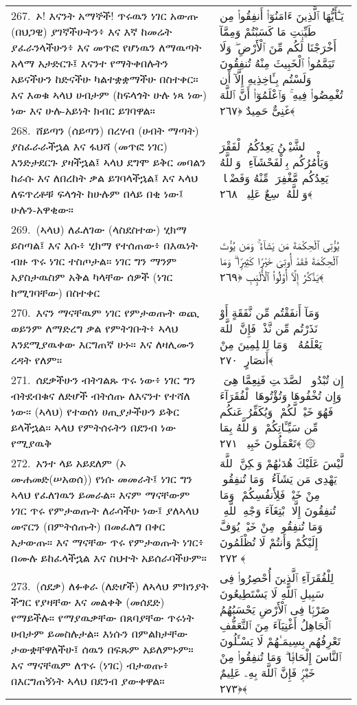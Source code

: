\documentclass[11pt,a4paper,oneside]{article}%
\newcommand{\mytextarabic}[1]{\textarabic{ #1 \flushright}}
\begin{document}
\begin{longtable}{%
  @{}
    p{}
  @{~~~}
    p{}
    @{}
}
267.\ ኦ! እናንት አማኞች! ጥሩዉን ነገር አውጡ (በህጋዊ) ያገኛችሁትን፥ እና እኛ ከመሬት ያፈራንላችሁን፥ እና መጥፎ የሆነዉን ለማዉጣት አላማ አታድርጉ፤ እናንተ የማትቀበሉትን አይናችሁን ከድናችሁ ካልተቋቋማችሁ በስተቀር። እና እወቁ ኣላህ ሀብታም (ከፍላጎት ሁሉ ነጻ ነው) ነው እና ሁሉ-አይነት ክብር ይገባዋል። &  \mytextarabic{ يَـٰٓأَيُّهَا ٱلَّذِينَ ءَامَنُوٓا۟ أَنفِقُوا۟ مِن طَيِّبَٟتِ مَا كَسَبْتُمْ وَمِمَّآ أَخْرَجْنَا لَكُم مِّنَ ٱلْأَرْضِ ۖ وَلَا تَيَمَّمُوا۟ ٱلْخَبِيثَ مِنْهُ تُنفِقُونَ وَلَسْتُم بِـَٔاخِذِيهِ إِلَّآ أَن تُغْمِضُوا۟ فِيهِ ۚ وَٱعْلَمُوٓا۟ أَنَّ ٱللَّهَ غَنِىٌّ حَمِيدٌ ﴿٢٦٧﴾}\\
268.\ ሸይጣን (ሰይጣን) በረሃብ (ሀብት ማጣት) ያስፈራራችኋል እና ፋህሻ (መጥፎ ነገር) እንድታደርጉ ያዛችኋል፤ ኣላህ ደግሞ ይቅር መባልን ከራሱ እና ለበረከት ቃል ይገባላችኋል፤ እና ኣላህ ለፍጥረቶቹ ፍላጎት ከሁሉም በላይ በቂ ነው፤ ሁሉን-አዋቂው። &  \mytextarabic{ٱلشَّيْطَٟنُ يَعِدُكُمُ ٱلْفَقْرَ وَيَأْمُرُكُم بِٱلْفَحْشَآءِ ۖ وَٱللَّهُ يَعِدُكُم مَّغْفِرَةًۭ مِّنْهُ وَفَضْلًۭا ۗ وَٱللَّهُ وَٟسِعٌ عَلِيمٌۭ ﴿٢٦٨﴾}\\
269.\ (ኣላህ) ለፈለገው (ላስደስተው) ሂክማ ይስጣል፤ እና እሱ፥ ሂክማ የተሰጠው፥ በእዉነት ብዙ ጥሩ ነገር ተስጦታል። ነገር ግን ማንም አያስታዉስም አቅል ካላቸው ሰዎች (ነገር ከሚገባቸው) በስተቀር &  \mytextarabic{يُؤْتِى ٱلْحِكْمَةَ مَن يَشَآءُ ۚ وَمَن يُؤْتَ ٱلْحِكْمَةَ فَقَدْ أُوتِىَ خَيْرًۭا كَثِيرًۭا ۗ وَمَا يَذَّكَّرُ إِلَّآ أُو۟لُوا۟ ٱلْأَلْبَٟبِ ﴿٢٦٩﴾}\\
270.\ እናን ማናቸዉም ነገር የምታወጡት ወጪ ወይንም ለማድረግ ቃል የምትገቡት፥ ኣላህ እንደሚያዉቀው እርግጠኛ ሁኑ። እና ለዛሊሙን ረዳት የለም። &  \mytextarabic{وَمَآ أَنفَقْتُم مِّن نَّفَقَةٍ أَوْ نَذَرْتُم مِّن نَّذْرٍۢ فَإِنَّ ٱللَّهَ يَعْلَمُهُۥ ۗ وَمَا لِلظَّٟلِمِينَ مِنْ أَنصَارٍ ﴿٢٧٠﴾}\\
271.\ ሰደቃችሁን ብትገልጹ ጥሩ ነው፥ ነገር ግን ብትደብቁና ለድሆች ብትሰጡ ለእናንተ የተሻለ ነው። (ኣላህ) የተወሰነ ሀጢያታችሁን ይቅር ይላችኋል። ኣላህ የምትሰሩትን በደንብ ነው የሚያዉቅ &  \mytextarabic{إِن تُبْدُوا۟ ٱلصَّدَقَٟتِ فَنِعِمَّا هِىَ ۖ وَإِن تُخْفُوهَا وَتُؤْتُوهَا ٱلْفُقَرَآءَ فَهُوَ خَيْرٌۭ لَّكُمْ ۚ وَيُكَفِّرُ عَنكُم مِّن سَيِّـَٔاتِكُمْ ۗ وَٱللَّهُ بِمَا تَعْمَلُونَ خَبِيرٌۭ ﴿٢٧١﴾ ۞}\\
272.\ አንተ ላይ አይደለም (ኦ ሙሐመድ(ሠአወሰ)) የነሱ መመራት፤ ነገር ግን ኣላህ የፈለገዉን ይመራል። እናም ማናቸውም ነገር ጥሩ የምታወጡት ለራሳችሁ ነው፤ ያለኣላህ መኖርን (በምትሰጡት) በመፈለግ በቀር አታውጡ። እና ማናቸው ጥሩ የምታወጡት ነገር፥ በሙሉ ይከፈላችኋል እና ስህተት አይሰራባችሁም። &  \mytextarabic{ لَّيْسَ عَلَيْكَ هُدَىٰهُمْ وَلَٟكِنَّ ٱللَّهَ يَهْدِى مَن يَشَآءُ ۗ وَمَا تُنفِقُوا۟ مِنْ خَيْرٍۢ فَلِأَنفُسِكُمْ ۚ وَمَا تُنفِقُونَ إِلَّا ٱبْتِغَآءَ وَجْهِ ٱللَّهِ ۚ وَمَا تُنفِقُوا۟ مِنْ خَيْرٍۢ يُوَفَّ إِلَيْكُمْ وَأَنتُمْ لَا تُظْلَمُونَ ﴿٢٧٢﴾}\\
273.\ (ሰደቃ) ለፉቀራ (ለድሆች) ለኣላህ ምክንያት ችግር የያዛቸው እና መልቀቅ (መሰደድ) የማይችሉ። የማያዉቃቸው በጸባያቸው ጥሩነት ሀብታም ይመስሉታል። እነሱን በምልክታቸው ታውቋቸዋለችሁ፤ ሰዉን በፍጹም አይለምኑም። እና ማናቸዉም ለጥሩ (ነገር) ብታወጡ፥ በእርግጠኝነት ኣላህ በደንብ ያውቀዋል።  &  \mytextarabic{ لِلْفُقَرَآءِ ٱلَّذِينَ أُحْصِرُوا۟ فِى سَبِيلِ ٱللَّهِ لَا يَسْتَطِيعُونَ ضَرْبًۭا فِى ٱلْأَرْضِ يَحْسَبُهُمُ ٱلْجَاهِلُ أَغْنِيَآءَ مِنَ ٱلتَّعَفُّفِ تَعْرِفُهُم بِسِيمَـٰهُمْ لَا يَسْـَٔلُونَ ٱلنَّاسَ إِلْحَافًۭا ۗ وَمَا تُنفِقُوا۟ مِنْ خَيْرٍۢ فَإِنَّ ٱللَّهَ بِهِۦ عَلِيمٌ ﴿٢٧٣﴾}\\

\end{longtable}
\end{document}
